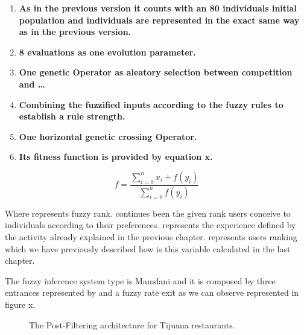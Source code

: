 \begin{enumerate}
	\item  \textbf{As in the previous version it counts with an 80 individuals initial population and individuals are represented in the exact same way as in the previous version.
	}
	
	\item  \textbf{8 evaluations as one evolution parameter.}
	
	\item  \textbf{One genetic Operator as aleatory selection between competition and … } 
	\item  \textbf{Combining the fuzzified inputs according to the fuzzy rules to establish a rule strength.} 
	\item  \textbf{One horizontal genetic crossing Operator.}
	\item  \textbf{Its fitness function is provided by equation x.}
\end{enumerate}

\begin{equation}\label{eq:fitfunc03}
\displaystyle f=\frac{\sum_{i=0}^{n}x_{i}+f(y_{i})}{\sum_{i=0}^{n}f(y_{i})}
\end{equation}

Where  represents fuzzy rank.
continues been the given rank users conceive to individuals according to their preferences.
represents the experience defined by the activity already explained in the previous chapter.
represents users ranking which we have previously described how is this variable calculated in the last chapter.

The fuzzy inference system type is Mamdani and it is composed by three entrances represented by  and a fuzzy rate exit as we can observe represented in figure x.

\begin{figure}
	\centering
	\setlength\fboxsep{0pt}
	\caption{The Post-Filtering architecture for Tijuana restaurants.}
	\label{fig:postfiltering5}     
\end{figure}

